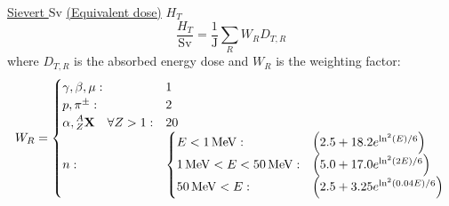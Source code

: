 		\href{https://en.wikipedia.org/wiki/Sievert}{Sievert $\mathrm{Sv}$} \href{https://en.wikipedia.org/wiki/Equivalent_dose}{(Equivalent dose)} $H_T$
		\begin{equation}
			\frac{H_T}{\mathrm{Sv}} = \frac{1}{\mathrm{J}}\sum_R W_R D_{T,R}			
		\end{equation}
		where $D_{T,R}$ is the absorbed energy dose and $W_R$ is the weighting factor:
		\begin{equation}
			\begin{aligned}
				W_R =
				\begin{cases}
					\gamma,\beta,\mu: & 1 \\
					p, \pi^\pm: & 2 \\
					\alpha, \prescript{A}{Z}{\mathbf{X}}\quad\forall Z>1: & 20 \\
					n: &\begin{cases}
						E<1\,\mathrm{MeV}: & \left( 2.5+18.2 e^{\ln^2(E)/6} \right) \\
						1\,\mathrm{MeV} <E<50\,\mathrm{MeV}: & \left( 5.0+17.0 e^{\ln^2(2E)/6} \right) \\
						50\,\mathrm{MeV}<E: & \left( 2.5+3.25 e^{\ln^2(0.04E)/6} \right) \\
					\end{cases}
				\end{cases}\\
			\end{aligned}
		\end{equation}
